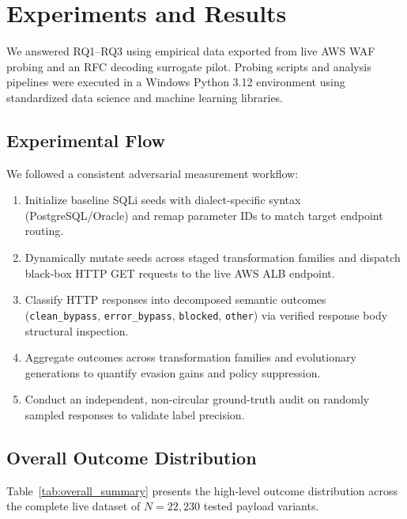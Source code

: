 \section{Experiments and Results}
\label{sec:experiments}
We answered RQ1--RQ3 using empirical data exported from live AWS WAF probing and an RFC decoding surrogate pilot. Probing scripts and analysis pipelines were executed in a Windows Python 3.12 environment using standardized data science and machine learning libraries.

\subsection{Experimental Flow}
We followed a consistent adversarial measurement workflow:
\begin{enumerate}
  \item Initialize baseline SQLi seeds with dialect-specific syntax (PostgreSQL/Oracle) and remap parameter IDs to match target endpoint routing.
  \item Dynamically mutate seeds across staged transformation families and dispatch black-box HTTP GET requests to the live AWS ALB endpoint.
  \item Classify HTTP responses into decomposed semantic outcomes (\texttt{clean\_bypass}, \texttt{error\_bypass}, \texttt{blocked}, \texttt{other}) via verified response body structural inspection.
  \item Aggregate outcomes across transformation families and evolutionary generations to quantify evasion gains and policy suppression.
  \item Conduct an independent, non-circular ground-truth audit on randomly sampled responses to validate label precision.
\end{enumerate}

\subsection{Overall Outcome Distribution}
Table~\ref{tab:overall_summary} presents the high‑level outcome distribution across the complete live dataset of $N=22{,}230$ tested payload variants.

